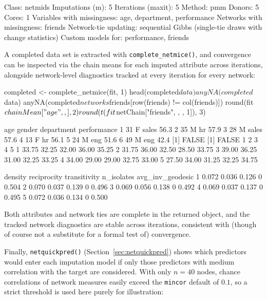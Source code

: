 \documentclass[11pt,a4paper]{article}
\newcommand{\code}[1]{\texttt{#1}}
\begin{document}
\begin{Routput}
Class: netmids
Imputations (m): 5   Iterations (maxit): 5   Method: pmm   Donors: 5   Cores: 1
Variables with missingness: age, department, performance
Networks with missingness: friends
Network-tie updating: sequential Gibbs (single-tie draws with change
statistics)
Custom models for: performance, friends
\end{Routput}

A completed data set is extracted with \code{complete\_netmice()}, and
convergence can be inspected via the chain means for each imputed attribute
across iterations, alongside network-level diagnostics tracked at every
iteration for every network:

\begin{Rinput}
completed <- complete_netmice(fit, 1)
head(completed$data)
anyNA(completed$data)
anyNA(completed$networks$friends[row(friends) != col(friends)])
round(fit$chainMean["age", , ], 2)
round(t(fit$netChain["friends", , , 1]), 3)
\end{Rinput}

\begin{Routput}
  age gender department performance
1  31      F      sales        56.3
2  35      M         hr        57.9
3  28      M      sales        57.6
4  13      F         hr        56.1
5  24      M        eng        51.6
6  49      M        eng        42.4
[1] FALSE
[1] FALSE
      1     2     3     4     5
1 33.75 32.25 32.00 36.00 35.25
2 31.75 36.00 32.50 28.50 33.75
3 39.00 36.25 31.00 32.25 33.25
4 34.00 29.00 29.00 32.75 33.00
5 27.50 34.00 31.25 32.25 34.75

  density reciprocity transitivity n_isolates avg_inv_geodesic
1   0.072       0.036        0.126          0            0.504
2   0.070       0.037        0.139          0            0.496
3   0.069       0.056        0.138          0            0.492
4   0.069       0.037        0.137          0            0.495
5   0.072       0.036        0.134          0            0.500
\end{Routput}

Both attributes and network ties are complete in the returned object, and
the tracked network diagnostics are stable across iterations, consistent
with (though of course not a substitute for a formal test of) convergence.

Finally, \code{netquickpred()} (Section~\ref{sec:netquickpred}) shows
which predictors would enter each imputation model if only those predictors with
medium correlation with the target are considered. With only $n = 40$ nodes,
chance correlations of network measures easily exceed the \code{mincor} default
of $0.1$, so a strict threshold is used here purely for illustration:
\end{document}
